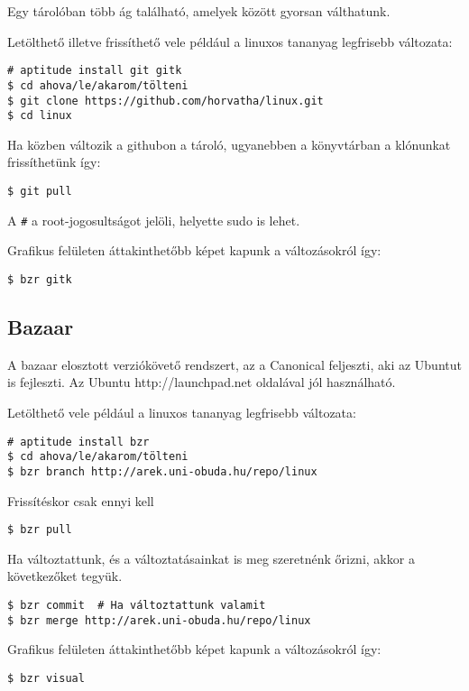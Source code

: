 \documentclass[a4paper]{article}
\begin{document}
Egy tárolóban több ág található, amelyek között gyorsan
válthatunk.

Letölthető illetve frissíthető vele például a linuxos tananyag
legfrisebb változata:

\begin{Verbatim}
# aptitude install git gitk
$ cd ahova/le/akarom/tölteni
$ git clone https://github.com/horvatha/linux.git
$ cd linux
\end{Verbatim}

Ha közben változik a githubon a tároló, ugyanebben a könyvtárban a
klónunkat frissíthetünk így:

\begin{Verbatim}
$ git pull
\end{Verbatim}

A \verb"#" a root-jogosultságot jelöli, helyette sudo is lehet.

Grafikus felületen áttakinthetőbb képet kapunk a változásokról így:
\begin{Verbatim}
$ bzr gitk
\end{Verbatim}

\subsection{Bazaar}
\label{seq:bazaar}
A bazaar elosztott verziókövető rendszert, az a Canonical feljeszti, aki
az Ubuntut is fejleszti. Az Ubuntu http://launchpad.net oldalával jól használható.

Letölthető vele például a linuxos tananyag legfrisebb változata:

\begin{Verbatim}
# aptitude install bzr
$ cd ahova/le/akarom/tölteni
$ bzr branch http://arek.uni-obuda.hu/repo/linux
\end{Verbatim}

Frissítéskor csak ennyi kell

\begin{Verbatim}
$ bzr pull
\end{Verbatim}

Ha változtattunk, és a változtatásainkat is meg szeretnénk őrizni, akkor
a következőket tegyük.

\begin{Verbatim}
$ bzr commit  # Ha változtattunk valamit
$ bzr merge http://arek.uni-obuda.hu/repo/linux
\end{Verbatim}

Grafikus felületen áttakinthetőbb képet kapunk a változásokról így:
\begin{Verbatim}
$ bzr visual
\end{Verbatim}
\end{document}
